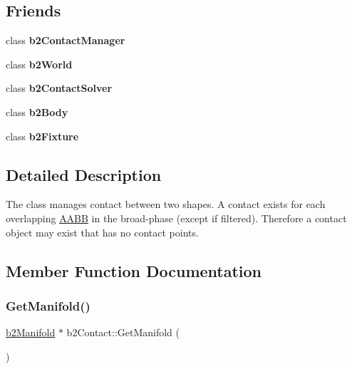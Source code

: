 \subsection*{Friends}
\begin{DoxyCompactItemize}
\item 
\mbox{\label{classb2Contact_a3bbd3ece64fd6a24342844069f4f6ec0}} 
class {\bfseries b2\+Contact\+Manager}
\item 
\mbox{\label{classb2Contact_ac7f385a7c800a297a8a6e9be3512e3ab}} 
class {\bfseries b2\+World}
\item 
\mbox{\label{classb2Contact_a631e20cb9b11964da786db8a341b92bc}} 
class {\bfseries b2\+Contact\+Solver}
\item 
\mbox{\label{classb2Contact_acd34621309c1bdec7335f7545253d704}} 
class {\bfseries b2\+Body}
\item 
\mbox{\label{classb2Contact_ac3af68958d0520ce98084fc0c5b75f63}} 
class {\bfseries b2\+Fixture}
\end{DoxyCompactItemize}


\subsection{Detailed Description}
The class manages contact between two shapes. A contact exists for each overlapping \hyperlink{classAABB}{A\+A\+BB} in the broad-\/phase (except if filtered). Therefore a contact object may exist that has no contact points. 

\subsection{Member Function Documentation}
\mbox{\label{classb2Contact_ab0597077b23615476327f9b32d9c4979}} 
\subsubsection{\texorpdfstring{Get\+Manifold()}{GetManifold()}\hspace{0.1cm}{\footnotesize\ttfamily [1/2]}}
{\footnotesize\ttfamily \hyperlink{structb2Manifold}{b2\+Manifold} $\ast$ b2\+Contact\+::\+Get\+Manifold (\begin{DoxyParamCaption}{ }\end{DoxyParamCaption})\hspace{0.3cm}{\ttfamily [inline]}}

